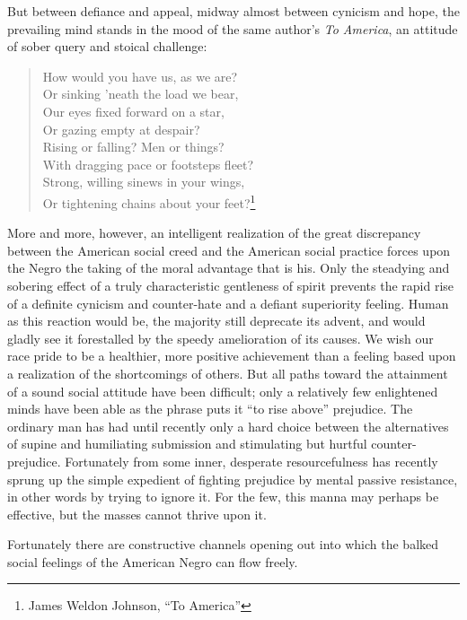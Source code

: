 \documentclass[12pt]{article}
\begin{document}
But between defiance and appeal, midway almost between cynicism and hope, the prevailing mind stands in the mood of the same author's \emph{To America}, an attitude of sober query and stoical challenge:

\begin{quote}
   How would you have us, as we are?\\
   Or sinking 'neath the load we bear,\\
   Our eyes fixed forward on a star,\\
   Or gazing empty at despair?\\
   Rising or falling? Men or things?\\
   With dragging pace or footsteps fleet?\\
   Strong, willing sinews in your wings,\\
   Or tightening chains about your feet?\footnote{James Weldon Johnson, ``To America''}
\end{quote}

More and more, however, an intelligent realization of the great discrepancy between the American social creed and the American social practice forces upon the Negro the taking of the moral advantage that is his. Only the steadying and sobering effect of a truly characteristic gentleness of spirit prevents the rapid rise of a definite cynicism and counter-hate and a defiant superiority feeling. Human as this reaction would be, the majority still deprecate its advent, and would gladly see it forestalled by the speedy amelioration of its causes. We wish our race pride to be a healthier, more positive achievement than a feeling based upon a realization of the shortcomings of others. But all paths toward the attainment of a sound social attitude have been difficult; only a relatively few enlightened minds have been able as the phrase puts it ``to rise above'' prejudice. The ordinary man has had until recently only a hard choice between the alternatives of supine and humiliating submission and stimulating but hurtful counter-prejudice. Fortunately from some inner, desperate resourcefulness has recently sprung up the simple expedient of fighting prejudice by mental passive resistance, in other words by trying to ignore it. For the few, this manna may perhaps be effective, but the masses cannot thrive upon it.

Fortunately there are constructive channels opening out into which the balked social feelings of the American Negro can flow freely.
\end{document}
